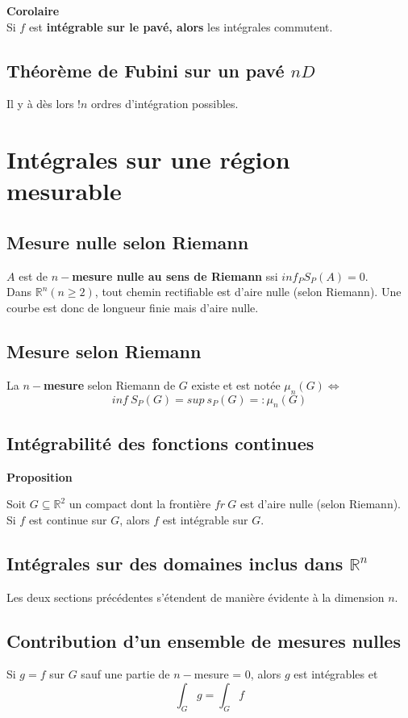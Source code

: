 \documentclass	[11pt, a4paper, openany]{book}
\begin{document}
\textbf{Corolaire}\\
Si $f$ est \textbf{intégrable sur le pavé, alors} les intégrales commutent.

\subsection{Théorème de Fubini sur un pavé $nD$}
Il y à dès lors $!n$ ordres d'intégration possibles.

\section{Intégrales sur une région mesurable}
\subsection{Mesure nulle selon Riemann}
$A$ est de \textbf{$n-$mesure nulle au sens de Riemann} ssi $inf_P S_P(A) = 0$.\\

Dans $\mathbb{R}^n (n \geq 2)$, tout chemin rectifiable est d'aire nulle (selon Riemann). Une courbe est donc de longueur finie mais d'aire nulle.

\subsection{Mesure selon Riemann}
La \textbf{$n-$mesure} selon Riemann de $G$ existe et est notée $\mu_n(G) \Leftrightarrow$
$$inf\ S_P(G) = sup\ s_P(G) =: \mu_n(G)$$

\subsection{Intégrabilité des fonctions continues}
\textbf{Proposition}
\begin{center}
Soit $G \subseteq \mathbb{R}^2$ un compact dont la frontière $fr\ G$ est d'aire nulle (selon Riemann). Si $f$ est continue sur $G$, alors $f$ est intégrable sur $G$.
\end{center}

\subsection{Intégrales sur des domaines inclus dans $\mathbb{R}^n$}
Les deux sections précédentes s'étendent de manière évidente à la dimension $n$.

\subsection{Contribution d'un ensemble de mesures nulles}
Si $g = f$ sur $G$ sauf une partie de $n-$mesure = 0, alors $g$ est intégrables et 
$$\int_G g = \int_G f$$
\end{document}
